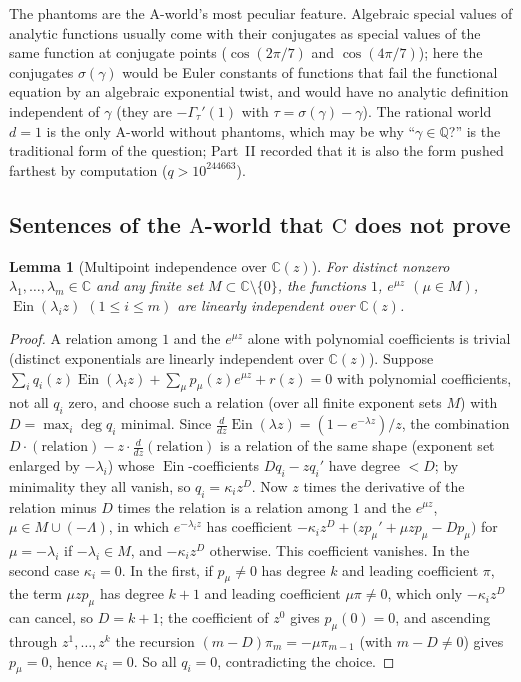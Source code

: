 \documentclass[11pt,a4paper]{article}
\newcommand{\Q}{\mathbb Q}
\newcommand{\C}{\mathbb C}
\newcommand{\Ein}{\operatorname{Ein}}
\newtheorem{lemma}[theorem]{Lemma}
\theoremstyle{definition}
\theoremstyle{remark}
\numberwithin{equation}{section}
\begin{document}
The phantoms are the $\mathrm A$-world's most peculiar feature. Algebraic special values
of analytic functions usually come with their conjugates as special values of the same
function at conjugate points ($\cos(2\pi/7)$ and $\cos(4\pi/7)$); here the conjugates
$\sigma(\gamma)$ would be Euler constants of functions that fail the functional equation by
an algebraic exponential twist, and would have no analytic definition independent of
$\gamma$ (they are $-\Gamma_\tau'(1)$ with $\tau=\sigma(\gamma)-\gamma$). The rational world
$d=1$ is the only $\mathrm A$-world without phantoms, which may be why ``$\gamma\in\Q$?''
is the traditional form of the question; Part~II recorded that it is also the form pushed
farthest by computation ($q>10^{244663}$).

\subsection{Sentences of the $\mathrm A$-world that $\mathrm C$ does not prove}

\begin{lemma}[Multipoint independence over $\C(z)$]\label{IV:lem:multipoint}
For distinct nonzero $\lambda_1,\dots,\lambda_m\in\C$ and any finite set $M\subset\C\setminus\{0\}$,
the functions $1$, $e^{\mu z}$ $(\mu\in M)$, $\Ein(\lambda_iz)$ $(1\le i\le m)$ are linearly
independent over $\C(z)$.
\end{lemma}
\begin{proof}
A relation among $1$ and the $e^{\mu z}$ alone with polynomial coefficients is trivial
(distinct exponentials are linearly independent over $\C(z)$). Suppose
$\sum_iq_i(z)\Ein(\lambda_iz)+\sum_{\mu}p_\mu(z)e^{\mu z}+r(z)=0$ with polynomial
coefficients, not all $q_i$ zero, and choose such a relation (over all finite exponent
sets $M$) with $D=\max_i\deg q_i$ minimal. Since
$\frac{d}{dz}\Ein(\lambda z)=(1-e^{-\lambda z})/z$, the combination
$D\cdot(\text{relation})-z\cdot\frac{d}{dz}(\text{relation})$ is a relation of the same
shape (exponent set enlarged by $-\lambda_i$) whose $\Ein$-coefficients $Dq_i-zq_i'$ have
degree $<D$; by minimality they all vanish, so $q_i=\kappa_iz^D$. Now $z$ times the
derivative of the relation minus $D$ times the relation is a relation among $1$ and the
$e^{\mu z}$, $\mu\in M\cup(-\Lambda)$, in which $e^{-\lambda_iz}$ has coefficient
$-\kappa_iz^D+\bigl(zp_\mu'+\mu zp_\mu-Dp_\mu\bigr)$ for $\mu=-\lambda_i$ if
$-\lambda_i\in M$, and $-\kappa_iz^D$ otherwise. This coefficient vanishes. In the
second case $\kappa_i=0$. In the first, if $p_\mu\ne0$ has degree $k$ and leading
coefficient $\pi$, the term $\mu zp_\mu$ has degree $k+1$ and leading coefficient
$\mu\pi\ne0$, which only $-\kappa_iz^D$ can cancel, so $D=k+1$; the coefficient of $z^0$
gives $p_\mu(0)=0$, and ascending through $z^1,\dots,z^k$ the recursion
$(m-D)\pi_m=-\mu\pi_{m-1}$ (with $m-D\ne0$) gives $p_\mu=0$, hence $\kappa_i=0$. So all
$q_i=0$, contradicting the choice.
\end{proof}
\end{document}
